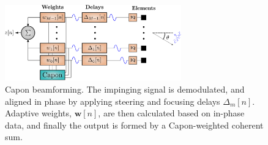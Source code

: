 \documentclass[journal]{IEEEtran}
\newcommand{\mat}[1]{\mathbf{#1}}
\renewcommand{\vec}[1]{\mathbf{#1}}
\begin{document}

\begin{figure}
\centerline{\includegraphics[width=3in]{gfx/beamforming_mv.eps}}
\caption{Capon beamforming. The impinging signal is demodulated, and aligned in phase by applying steering and focusing delays $\Delta_m[n]$. Adaptive weights, $\vec{w}[n]$, are then calculated based on in-phase data, and finally the output is formed by a Capon-weighted coherent sum.}
\label{fig:mvbf}
\end{figure}
\end{document}
